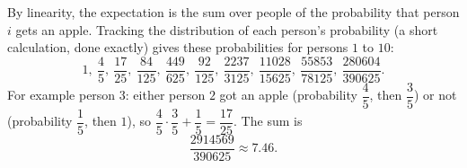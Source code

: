 By linearity, the expectation is the sum over people of the probability that person $i$ gets an apple. Tracking the distribution of each person's probability (a short calculation, done exactly) gives these probabilities for persons $1$ to $10$:
\[1,\ \dfrac45,\ \dfrac{17}{25},\ \dfrac{84}{125},\ \dfrac{449}{625},\ \dfrac{92}{125},\ \dfrac{2237}{3125},\ \dfrac{11028}{15625},\ \dfrac{55853}{78125},\ \dfrac{280604}{390625}.\]
For example person $3$: either person $2$ got an apple (probability $\dfrac45$, then $\dfrac35$) or not (probability $\dfrac15$, then $1$), so $\dfrac45\cdot\dfrac35+\dfrac15=\dfrac{17}{25}$. The sum is
\[\boxed{\dfrac{2914569}{390625}}\approx7.46.\]

